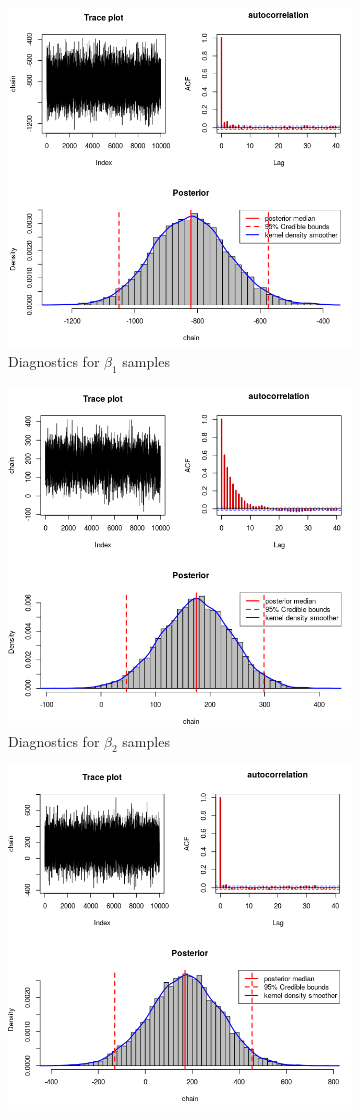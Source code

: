 \documentclass[11pt,twoside]{report}
\begin{document}
\begin{figure}[H]
	\begin{subfigure}[H]{0.50\linewidth}
		\centering
		\includegraphics[width=65 mm]{pictures/beta_1.png}
		\caption{Diagnostics for $ \beta_1 $ samples}
		\label{fig:beta_1}
	\end{subfigure}
	\hfill
	\begin{subfigure}[H]{0.50\linewidth}
		\centering
		\includegraphics[width=65 mm]{pictures/beta_2.png}
		\caption{Diagnostics for $ \beta_2 $ samples}
		\label{fig:beta_2}
	\end{subfigure}%
	\vfill
	\begin{subfigure}[H]{0.50\linewidth}
		\centering
		\includegraphics[width=65 mm]{pictures/nu_1.png}

\end{subfigure}
\end{figure}
\end{document}
